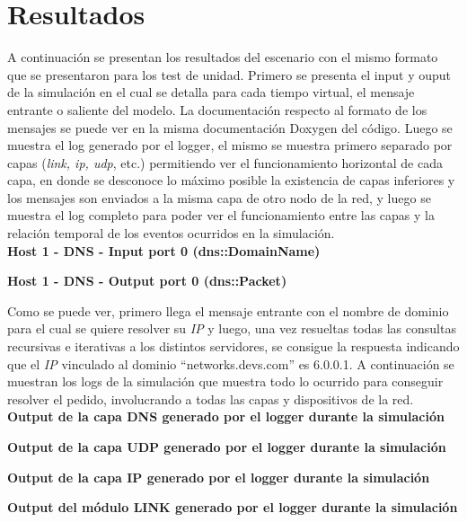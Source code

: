 \documentclass[10pt,a4paper]{article}
\begin{document}
\section{Resultados}

A continuación se presentan los resultados del escenario con el mismo formato que se presentaron para los test de unidad. Primero se presenta el input y ouput de la simulación en el cual se detalla para cada tiempo virtual, el mensaje entrante o saliente del modelo. La documentación respecto al formato de los mensajes se puede ver en la misma documentación Doxygen del código. Luego se muestra el log generado por el logger, el mismo se muestra primero separado por capas (\textit{link, ip, udp}, etc.) permitiendo ver el funcionamiento horizontal de cada capa, en donde se desconoce lo máximo posible la existencia de capas inferiores y los mensajes son enviados a la misma capa de otro nodo de la red, y luego se muestra el log completo para poder ver el funcionamiento entre las capas y la relación temporal de los eventos ocurridos en la simulación. \\

\textbf{Host 1 - DNS - Input port 0 (dns::DomainName)}


\textbf{Host 1 - DNS - Output port 0 (dns::Packet)}


Como se puede ver, primero llega el mensaje entrante con el nombre de dominio para el cual se quiere resolver su \textit{IP} y luego, una vez resueltas todas las consultas recursivas e iterativas a los distintos servidores, se consigue la respuesta indicando que el \textit{IP} vinculado al dominio ``networks.devs.com'' es 6.0.0.1. A continuación se muestran los logs de la simulación que muestra todo lo ocurrido para conseguir resolver el pedido, involucrando a todas las capas y dispositivos de la red. \\

\textbf{Output de la capa DNS generado por el logger durante la simulación}


\textbf{Output de la capa UDP generado por el logger durante la simulación}


\textbf{Output de la capa IP generado por el logger durante la simulación}


\textbf{Output del módulo LINK generado por el logger durante la simulación}

\end{document}
